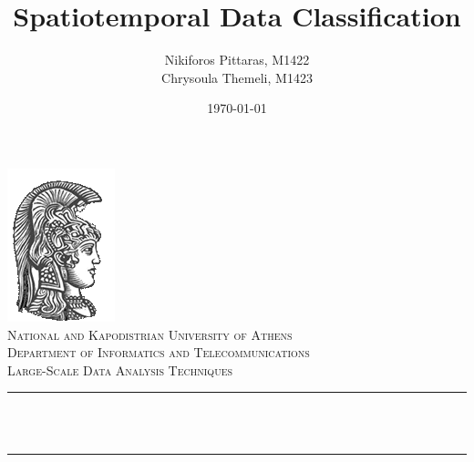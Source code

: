 \documentclass[12pt]{article}
\title{Spatiotemporal Data Classification}   %
\author{ Nikiforos Pittaras, M1422 \\ 
		 Chrysoula Themeli, M1423}                               %
\date{\today}  %
\makeatletter
\let\thetitle\@title
\let\theauthor\@author
\let\thedate\@date
\makeatother
\begin{document}
	
	
	\begin{titlepage}
		\centering
		\vspace*{0.5 cm}
		\includegraphics[scale = 0.75]{ekpalogo.png}\\[1.0 cm]   %
		\textsc{\LARGE National and Kapodistrian University of Athens}\\[2.0 cm]   %
		\textsc{\Large Department of Informatics and Telecommunications}\\[0.5 cm]               %
		\textsc{\large Large-Scale Data Analysis Techniques}\\[0.5 cm] %
		\rule{\linewidth}{0.2 mm} \\[0.4 cm]
		{ \huge \bfseries \thetitle}\\
		\rule{\linewidth}{0.2 mm} \\[1.5 cm]
		
		\begin{minipage}{0.4\textwidth}
			\begin{center} \large
				\theauthor
			\end{center}
		\end{minipage}~
		\begin{minipage}{0.4\textwidth}
		\end{minipage}\\[2 cm]
		
		{\large \thedate}\\[2 cm]
		
		\vfill
		
	\end{titlepage}
	
	
	\tableofcontents
    \newpage
	\listoffigures
	\newpage
	\listoftodos
	\newpage
	
\end{document}
